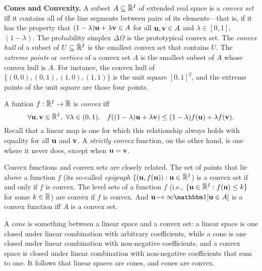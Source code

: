 \textbf{Cones and Convexity.}
A subset $A \subseteq \mskip1mu\overline{\mskip-1mu\mathbb R\!}\,^I$ of extended real space is a \emph{convex set} iff
it contains all of the line segments between pairs of its elements---that is, if
it has the property that
$
(1-\lambda) \mathbf u + \lambda \mathbf v \in A
$
for all $\mathbf u, \mathbf v \in A$ and $\lambda \in [0,1]$,
$(1-\lambda)$.
The probability simplex $\Delta \Omega$ is the prototypical convex set. 
The \emph{convex hull} of a subset of $U \subseteq \mskip1mu\overline{\mskip-1mu\mathbb R\!}\,^I$ is the smallest convex set that contains $U$. 
The \emph{extreme points} or \emph{vertices} of a convex set $A$ is the smallest subset 
of $A$ whose convex hull is $A$. 
For instance, the convex hull of $\{ (0,0), (0,1), (1,0), (1,1) \}$
is the unit square $[0,1]^2$, and the extreme points of the unit square are those four points. 

%
A funtion $f : \mskip1mu\overline{\mskip-1mu\mathbb R\!}\,^I \to \mskip1mu\overline{\mskip-1mu\mathbb R\!}\,$ is \emph{convex} iff
\[
    \forall \mathbf u, \mathbf v \in \mskip1mu\overline{\mskip-1mu\mathbb R\!}\,^I,~\forall \lambda \in (0,1).\quad
    f( (1-\lambda) \mathbf u + \lambda \mathbf v ) \le (1-\lambda) f(\mathbf u) + \lambda f(\mathbf v).
\]
Recall that a linear map is one for which this relationship always holds with equality for all $\mathbf u$ and $\mathbf v$. 
A \emph{strictly convex} function, on the other hand, is one where it never does, except when $\mathbf u = \mathbf v$. 

Convex functions and convex sets are closely related. The set of points that lie above a function $f$
 (its so-called \emph{epigraph} $\{ (\mathbf u, f(\mathbf u)) : \mathbf u \in \mskip1mu\overline{\mskip-1mu\mathbb R\!}\,^I$) 
is a convex set if and only if $f$ is convex. The level sets of a function $f$ (i.e., $\{ \mathbf u \in \mskip1mu\overline{\mskip-1mu\mathbb R\!}\,^I : f(\mathbf u) \le k \}$ for some $k \in \mskip1mu\overline{\mskip-1mu\mathbb R\!}\,$) are convex if $f$ is convex. And $\mat u \mapsto \infty \mathbbm 1[\mat u \in A]$ is a convex function iff $A$ is a convex set. 

A \emph{cone} is something between a linear space and a convex set: a linear space is one closed under linear combination with arbitrary coefficients, while a cone is one closed under linear combination with non-negative coefficients, and a convex space is closed under linear combination with non-negative coefficients that sum to one.
It follows that linear spaces are cones, and cones are convex.



